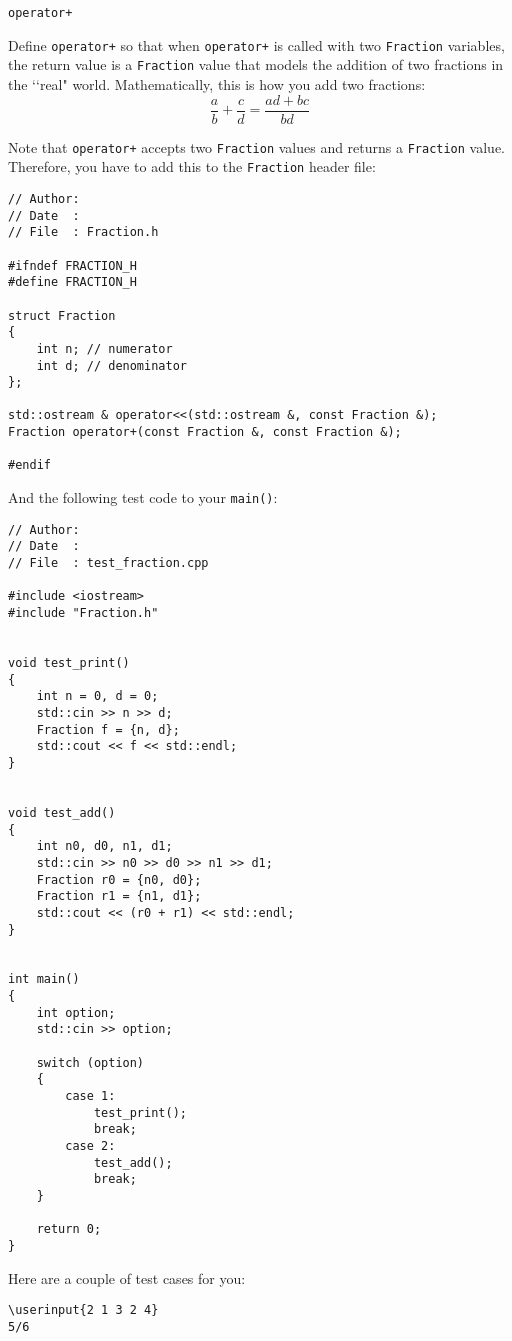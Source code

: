 \verb!operator+!

Define \verb!operator+! so that when \verb!operator+! is called with two
\verb!Fraction! variables, the return value is a \verb!Fraction! value
that models the addition of two fractions in the \lq\lq real" world.
Mathematically, this is how you add two fractions:
\[
  \frac{a}{b} + \frac{c}{d} = \frac{ad + bc}{bd}
\]

Note that \verb!operator+! accepts two \verb!Fraction! values and returns a
\verb!Fraction! value. Therefore, you have to add this to the \verb!Fraction!
header file:
\begin{Verbatim}[frame=single]
// Author: 
// Date  : 
// File  : Fraction.h

#ifndef FRACTION_H
#define FRACTION_H

struct Fraction
{
    int n; // numerator
    int d; // denominator
};

std::ostream & operator<<(std::ostream &, const Fraction &);
Fraction operator+(const Fraction &, const Fraction &);

#endif
\end{Verbatim}

And the following test code to your \verb!main()!:
{\small
\begin{Verbatim}[frame=single]
// Author: 
// Date  : 
// File  : test_fraction.cpp

#include <iostream>
#include "Fraction.h"


void test_print()
{
    int n = 0, d = 0;
    std::cin >> n >> d;
    Fraction f = {n, d};
    std::cout << f << std::endl;
}


void test_add()
{
    int n0, d0, n1, d1;
    std::cin >> n0 >> d0 >> n1 >> d1;  
    Fraction r0 = {n0, d0};
    Fraction r1 = {n1, d1};
    std::cout << (r0 + r1) << std::endl;
}


int main()
{
    int option;
    std::cin >> option;
    
    switch (option)
    {
        case 1:
            test_print();
            break;
        case 2:
            test_add();
            break;
    }

    return 0; 
}
\end{Verbatim}
}

Here are a couple of test cases for you:

\resett
\nextt
\begin{Verbatim}[frame=single, commandchars=\\\{\}]
\userinput{2 1 3 2 4}
5/6
\end{Verbatim}

